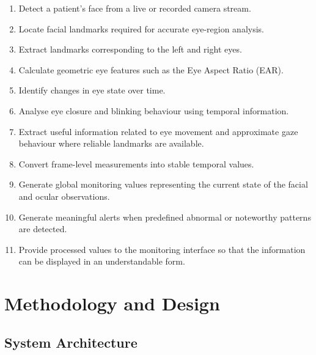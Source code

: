 \documentclass[12pt]{tietreport}
\begin{document}
\begin{enumerate}[leftmargin=*]

    \item Detect a patient's face from a live or recorded camera
    stream.

    \item Locate facial landmarks required for accurate eye-region
    analysis.

    \item Extract landmarks corresponding to the left and right eyes.

    \item Calculate geometric eye features such as the Eye Aspect
    Ratio (EAR).

    \item Identify changes in eye state over time.

    \item Analyse eye closure and blinking behaviour using temporal
    information.

    \item Extract useful information related to eye movement and
    approximate gaze behaviour where reliable landmarks are
    available.

    \item Convert frame-level measurements into stable temporal
    values.

    \item Generate global monitoring values representing the current
    state of the facial and ocular observations.

    \item Generate meaningful alerts when predefined abnormal or
    noteworthy patterns are detected.

    \item Provide processed values to the monitoring interface so that
    the information can be displayed in an understandable form.

\end{enumerate}


\chapter{Methodology and Design}

\section{System Architecture}
\end{document}
